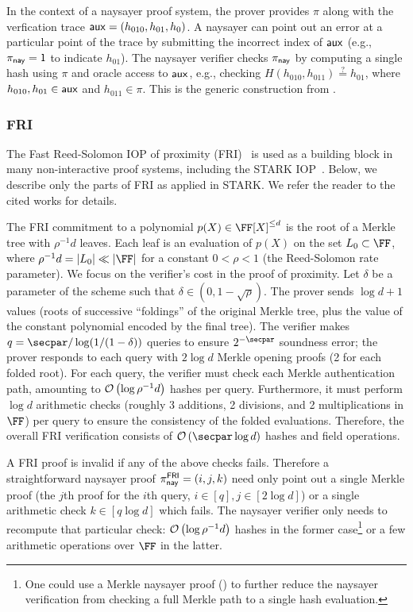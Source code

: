 In the context of a naysayer proof system, the prover provides $\pi$ along with the verfication trace $\mathsf{aux} = (h_{010}, h_{01}, h_{0})$. A naysayer can point out an error at a particular point of the trace by submitting the incorrect index of $\mathsf{aux}$ (e.g., $\pi_{\mathsf{nay}} = 1$ to indicate $h_{01}$). The naysayer verifier checks $\pi_{\mathsf{nay}}$ by computing a single hash using $\pi$ and oracle access to $\mathsf{aux}$, e.g., checking $H(h_{010}, h_{011}) \stackrel{?}{=} h_{01}$, where $h_{010}, h_{01} \in \mathsf{aux}$ and $h_{011} \in \pi$. This is the generic construction from .

\subsubsection{FRI}\label{sec:fri_naysayer}

The Fast Reed-Solomon IOP of proximity (FRI)~\cite{ICALP:BBHR18} is used as a building block in many non-interactive proof systems, including the STARK IOP~\cite{EPRINT:BBHR18}.
Below, we describe only the parts of FRI as applied in STARK. We refer the reader to the cited works for details.

The FRI commitment to a polynomial $p(X)\in\FF[X]^{\leq d}$ is the root of a Merkle tree with $\rho^{-1}d$ leaves. 
Each leaf is an evaluation of $p(X)$ on the set $L_0 \subset \FF$, where $\rho^{-1}d=\sizeof{L_0} \ll \sizeof{\FF}$ for a constant $0<\rho<1$ (the Reed-Solomon rate parameter). We focus on the verifier's cost in the proof of proximity. Let $\delta$ be a parameter of the scheme such that $\delta\in(0,1-\sqrt{\rho})$. The prover sends $\log{d}+1$ values (roots of successive ``foldings'' of the original Merkle tree, plus the value of the constant polynomial encoded by the final tree). The verifier makes $q=\secpar/\log(1/(1-\delta))$ queries to ensure $2^{-\secpar}$ soundness error; the prover responds to each query with $2\log{d}$ Merkle opening proofs (2 for each folded root). For each query, the verifier must check each Merkle authentication path, amounting to $\mathcal{O}\left(\log{\rho^{-1}d}\right)$ hashes per query. Furthermore, it must perform $\log{d}$ arithmetic checks (roughly 3 additions, 2 divisions, and 2 multiplications in $\FF$) per query to ensure the consistency of the folded evaluations. Therefore, the overall FRI verification consists of $\bigO{\secpar\log{d}}$ hashes and field operations.

A FRI proof is invalid if any of the above checks fails. Therefore a straightforward naysayer proof $\pi^{\mathsf{FRI}}_{\mathsf{nay}}=(i,j,k)$ need only point out a single Merkle proof (the $j$th proof for the $i$th query, $i\in[q], j \in [2\log{d}]$) or a single arithmetic check $k \in [q\log{d}]$ which fails. The naysayer verifier only needs to recompute that particular check: $\mathcal{O}\left(\log{\rho^{-1}d}\right)$ hashes in the former case\footnote{One could use a Merkle naysayer proof () to further reduce the naysayer verification from checking a full Merkle path to a single hash evaluation.} or a few arithmetic operations over $\FF$ in the latter.

